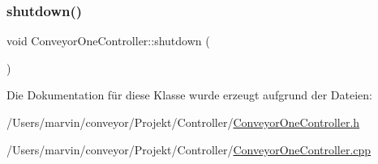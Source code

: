 \subsubsection{\texorpdfstring{shutdown()}{shutdown()}}
{\footnotesize\ttfamily void Conveyor\+One\+Controller\+::shutdown (\begin{DoxyParamCaption}{ }\end{DoxyParamCaption})}



Die Dokumentation für diese Klasse wurde erzeugt aufgrund der Dateien\+:\begin{DoxyCompactItemize}
\item 
/\+Users/marvin/conveyor/\+Projekt/\+Controller/\hyperlink{_conveyor_one_controller_8h}{Conveyor\+One\+Controller.\+h}\item 
/\+Users/marvin/conveyor/\+Projekt/\+Controller/\hyperlink{_conveyor_one_controller_8cpp}{Conveyor\+One\+Controller.\+cpp}\end{DoxyCompactItemize}
